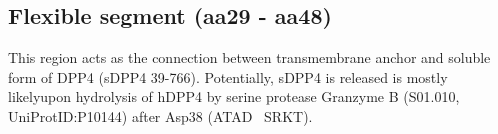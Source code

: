 \subsection{Flexible segment (aa29 - aa48)}

This region acts as the connection between transmembrane anchor and soluble form of DPP4 (sDPP4 39-766). Potentially, sDPP4 is released is mostly likelyupon hydrolysis of hDPP4 by serine protease Granzyme B (S01.010, UniProtID:P10144) after Asp38 (ATAD~\textbar 
SRKT).~\cite{Song_2018} 
